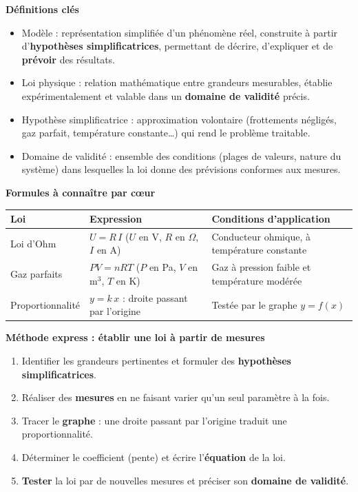 \documentclass[11pt]{article}
\newcommand{\cle}[1]{{\popxbold\color{popdark}#1}}
\begin{document}
\begin{bilan}
\textbf{Définitions clés}
\begin{itemize}
  \item \cle{Modèle} : représentation simplifiée d'un phénomène réel, construite à partir d'\textbf{hypothèses simplificatrices}, permettant de décrire, d'expliquer et de \textbf{prévoir} des résultats.
  \item \cle{Loi physique} : relation mathématique entre grandeurs mesurables, établie expérimentalement et valable dans un \textbf{domaine de validité} précis.
  \item \cle{Hypothèse simplificatrice} : approximation volontaire (frottements négligés, gaz parfait, température constante\ldots) qui rend le problème traitable.
  \item \cle{Domaine de validité} : ensemble des conditions (plages de valeurs, nature du système) dans lesquelles la loi donne des prévisions conformes aux mesures.
\end{itemize}

\textbf{Formules à connaître par cœur}
\begin{center}
\begin{tabularx}{\linewidth}{|l|X|X|}
\hline
\rowcolor{popblueL} \textbf{Loi} & \textbf{Expression} & \textbf{Conditions d'application} \\
\hline
Loi d'Ohm & $U = R\,I$ \quad ($U$ en V, $R$ en $\Omega$, $I$ en A) & Conducteur ohmique, à température constante \\
\hline
Gaz parfaits & $PV = nRT$ \quad ($P$ en Pa, $V$ en m$^3$, $T$ en K) & Gaz à pression faible et température modérée \\
\hline
Proportionnalité & $y = k\,x$ : droite passant par l'origine & Testée par le graphe $y = f(x)$ \\
\hline
\end{tabularx}
\end{center}

\textbf{Méthode express : établir une loi à partir de mesures}
\begin{enumerate}
  \item Identifier les grandeurs pertinentes et formuler des \textbf{hypothèses simplificatrices}.
  \item Réaliser des \textbf{mesures} en ne faisant varier qu'un seul paramètre à la fois.
  \item Tracer le \textbf{graphe} : une droite passant par l'origine traduit une proportionnalité.
  \item Déterminer le coefficient (pente) et écrire l'\textbf{équation} de la loi.
  \item \textbf{Tester} la loi par de nouvelles mesures et préciser son \textbf{domaine de validité}.
\end{enumerate}


\end{bilan}
\end{document}
